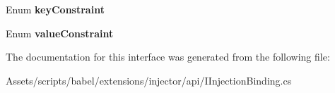\begin{DoxyCompactItemize}
\item 
\hypertarget{interfacebabel_1_1extensions_1_1injector_1_1api_1_1_i_injection_binding_aa6a72f2be0fb3ae3c930f86320ab4027}{Enum {\bfseries key\-Constraint}}\label{interfacebabel_1_1extensions_1_1injector_1_1api_1_1_i_injection_binding_aa6a72f2be0fb3ae3c930f86320ab4027}

\item 
\hypertarget{interfacebabel_1_1extensions_1_1injector_1_1api_1_1_i_injection_binding_af8ec9033faaeafa4905f322778ac2593}{Enum {\bfseries value\-Constraint}}\label{interfacebabel_1_1extensions_1_1injector_1_1api_1_1_i_injection_binding_af8ec9033faaeafa4905f322778ac2593}

\end{DoxyCompactItemize}


The documentation for this interface was generated from the following file\-:\begin{DoxyCompactItemize}
\item 
Assets/scripts/babel/extensions/injector/api/I\-Injection\-Binding.\-cs\end{DoxyCompactItemize}
